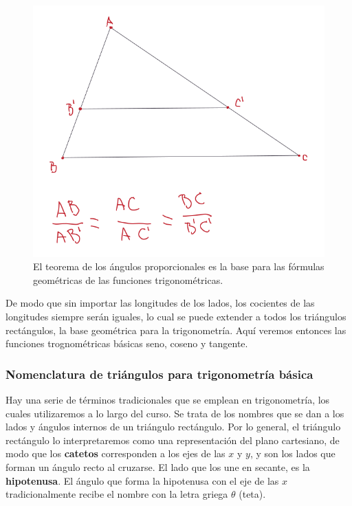 \documentclass[
]{book}
\begin{document}
\begin{figure}

{\centering \includegraphics{Unidad-I/Trian-prop} 

}

\caption{El teorema de los ángulos proporcionales es la base para las fórmulas geométricas de las funciones trigonométricas.}\label{fig:trian-prop}
\end{figure}

De modo que sin importar las longitudes de los lados, los cocientes de las longitudes siempre serán iguales, lo cual se puede extender a todos los triángulos rectángulos, la base geométrica para la trigonometría. Aquí veremos entonces las funciones trognométricas básicas seno, coseno y tangente.

\hypertarget{nomenclatura-de-triuxe1ngulos-para-trigonometruxeda-buxe1sica}{%
\subsubsection{Nomenclatura de triángulos para trigonometría básica}\label{nomenclatura-de-triuxe1ngulos-para-trigonometruxeda-buxe1sica}}

Hay una serie de términos tradicionales que se emplean en trigonometría, los cuales utilizaremos a lo largo del curso. Se trata de los nombres que se dan a los lados y ángulos internos de un triángulo rectángulo. Por lo general, el triángulo rectángulo lo interpretaremos como una representación del plano cartesiano, de modo que los \textbf{catetos} corresponden a los ejes de las \(x\) y \(y\), y son los lados que forman un ángulo recto al cruzarse. El lado que los une en secante, es la \textbf{hipotenusa}. El ángulo que forma la hipotenusa con el eje de las \(x\) tradicionalmente recibe el nombre con la letra griega \(\theta\) (teta).
\end{document}
